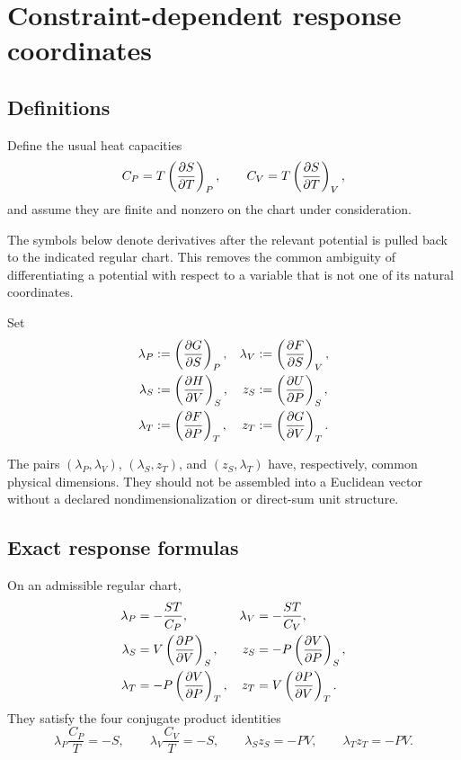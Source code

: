 \section{Constraint-dependent response coordinates}

\subsection{Definitions}

Define the usual heat capacities
\[
C_P=T\left(\frac{\partial S}{\partial T}\right)_{P},
\qquad
C_V=T\left(\frac{\partial S}{\partial T}\right)_{V},
\]
and assume they are finite and nonzero on the chart under consideration.

The symbols below denote derivatives after the relevant potential is pulled back to the indicated regular chart.  This removes the common ambiguity of differentiating a potential with respect to a variable that is not one of its natural coordinates.

\begin{definition}
Set
\begin{align}
\lambda_P&:=\left(\frac{\partial G}{\partial S}\right)_{P},&
\lambda_V&:=\left(\frac{\partial F}{\partial S}\right)_{V},\label{eq:lambda-caloric-def}\\
\lambda_S&:=\left(\frac{\partial H}{\partial V}\right)_{S},&
z_S&:=\left(\frac{\partial U}{\partial P}\right)_{S},\label{eq:lambda-adiabatic-def}\\
\lambda_T&:=\left(\frac{\partial F}{\partial P}\right)_{T},&
z_T&:=\left(\frac{\partial G}{\partial V}\right)_{T}.\label{eq:lambda-isothermal-def}
\end{align}
\end{definition}

The pairs $(\lambda_P,\lambda_V)$, $(\lambda_S,z_T)$, and $(z_S,\lambda_T)$ have, respectively, common physical dimensions.  They should not be assembled into a Euclidean vector without a declared nondimensionalization or direct-sum unit structure.

\subsection{Exact response formulas}

\begin{theorem}
On an admissible regular chart,
\begin{align}
\lambda_P&=-\frac{ST}{C_P},&
\lambda_V&=-\frac{ST}{C_V},\label{eq:lambda-caloric}\\
\lambda_S&=V\left(\frac{\partial P}{\partial V}\right)_{S},&
z_S&=-P\left(\frac{\partial V}{\partial P}\right)_{S},\label{eq:lambda-adiabatic}\\
\lambda_T&=-P\left(\frac{\partial V}{\partial P}\right)_{T},&
z_T&=V\left(\frac{\partial P}{\partial V}\right)_{T}.\label{eq:lambda-isothermal}
\end{align}
They satisfy the four conjugate product identities
\begin{equation}
\lambda_P\frac{C_P}{T}=-S,
\qquad
\lambda_V\frac{C_V}{T}=-S,
\qquad
\lambda_Sz_S=-PV,
\qquad
\lambda_Tz_T=-PV.
\label{eq:product-identities}
\end{equation}
\end{theorem}

